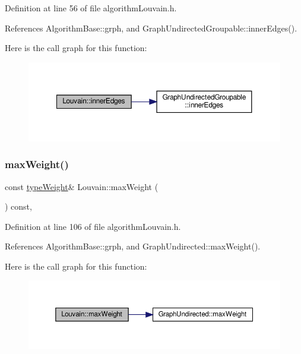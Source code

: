 Definition at line 56 of file algorithm\+Louvain.\+h.



References Algorithm\+Base\+::grph, and Graph\+Undirected\+Groupable\+::inner\+Edges().

Here is the call graph for this function\+:
\nopagebreak
\begin{figure}[H]
\begin{center}
\leavevmode
\includegraphics[width=350pt]{classLouvain_a18888635fdb482b3754730b6c2e0d6cb_cgraph}
\end{center}
\end{figure}
\mbox{\label{classLouvain_aad63606a401df51dcd30f30224527381}} 
\subsubsection{\texorpdfstring{max\+Weight()}{maxWeight()}}
{\footnotesize\ttfamily const \hyperlink{edge_8h_a2e7ea3be891ac8b52f749ec73fee6dd2}{type\+Weight}\& Louvain\+::max\+Weight (\begin{DoxyParamCaption}{ }\end{DoxyParamCaption}) const\hspace{0.3cm}{\ttfamily [inline]}, {\ttfamily [private]}}



Definition at line 106 of file algorithm\+Louvain.\+h.



References Algorithm\+Base\+::grph, and Graph\+Undirected\+::max\+Weight().

Here is the call graph for this function\+:
\nopagebreak
\begin{figure}[H]
\begin{center}
\leavevmode
\includegraphics[width=350pt]{classLouvain_aad63606a401df51dcd30f30224527381_cgraph}
\end{center}
\end{figure}
\mbox{\label{classLouvain_a22ad57b173ccd1b628d96391811a4265}} 

